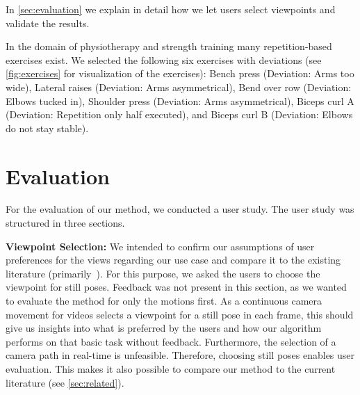 In \autoref{sec:evaluation} we explain in detail how we let users select viewpoints and validate the results.

In the domain of physiotherapy and strength training many repetition-based exercises exist. We selected the following six exercises with deviations (see \autoref{fig:exercises} for visualization of the exercises): Bench press (Deviation: Arms too wide), Lateral raises (Deviation: Arms asymmetrical), Bend over row (Deviation: Elbows tucked in), Shoulder press (Deviation: Arms asymmetrical), Biceps curl A (Deviation: Repetition only half executed), and Biceps curl B (Deviation: Elbows do not stay stable).



\section{Evaluation \label{sec:evaluation}}
For the evaluation of our method, we conducted a user study.
The user study was structured in three sections.

\textbf{Viewpoint Selection:} We intended to confirm our assumptions of user preferences for the views regarding our use case and compare it to the existing literature (primarily~\cite{zusne1970vpf}). For this purpose, we asked the users to choose the viewpoint for still poses. Feedback was not present in this section, as we wanted to evaluate the method for only the motions first. As a continuous camera movement for videos selects a viewpoint for a still pose in each frame, this should give us insights into what is preferred by the users and how our algorithm performs on that basic task without feedback. Furthermore, the selection of a camera path in real-time is unfeasible. Therefore, choosing still poses enables user evaluation. This makes it also possible to compare our method to the current literature (see \autoref{sec:related}).

